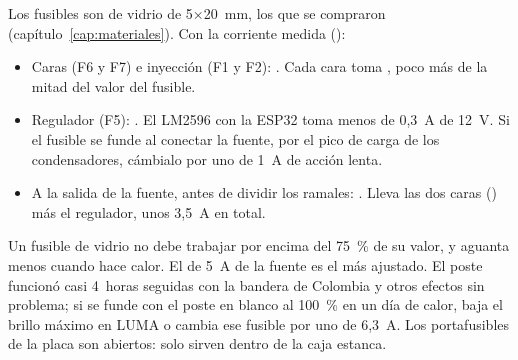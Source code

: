 Los fusibles son de vidrio de 5×20~mm, los que se compraron (capítulo~\ref{cap:materiales}). Con la corriente medida ():
\begin{itemize}
\item Caras (F6 y F7) e inyección (F1 y F2): . Cada cara toma , poco más de la mitad del valor del fusible.
\item Regulador (F5): . El LM2596 con la ESP32 toma menos de 0,3~A de 12~V. Si el fusible se funde al conectar la fuente, por el pico de carga de los condensadores, cámbialo por uno de 1~A de acción lenta.
\item A la salida de la fuente, antes de dividir los ramales: . Lleva las dos caras () más el regulador, unos 3,5~A en total.
\end{itemize}
Un fusible de vidrio no debe trabajar por encima del 75~\% de su valor, y aguanta menos cuando hace calor. El de 5~A de la fuente es el más ajustado. El poste funcionó casi 4~horas seguidas con la bandera de Colombia y otros efectos sin problema; si se funde con el poste en blanco al 100~\% en un día de calor, baja el brillo máximo en LUMA o cambia ese fusible por uno de 6,3~A. Los portafusibles de la placa son abiertos: solo sirven dentro de la caja estanca.

